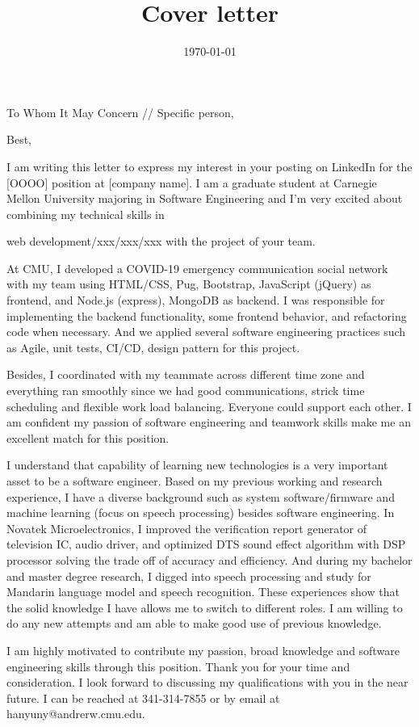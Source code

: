 \documentclass[11pt,a4paper,roman]{moderncv}        %
\title{Cover letter}                               %
\begin{document}
\recipient{\ }{}
\date{\today}
\opening{To Whom It May Concern // Specific person,}
\closing{Best,}
\makelettertitle

I am writing this letter to express my interest in your posting on LinkedIn for the [OOOO] position at [company name]. 
I am a graduate student at Carnegie Mellon University majoring in Software Engineering 
and I'm very excited about combining my technical skills in

web development/xxx/xxx/xxx with the project of your team.

At CMU, I developed a COVID-19 emergency communication social network with my team using HTML/CSS, Pug, Bootstrap, JavaScript
(jQuery) as frontend, and Node.js (express), MongoDB as backend. 
I was responsible for implementing the backend functionality, some frontend behavior, 
and refactoring code when necessary. 
And we applied several software engineering practices such as Agile, unit tests,
CI/CD, design pattern for this project. 

Besides, I coordinated with my teammate across different time zone and everything ran smoothly since we had good communications, 
strick time scheduling and flexible work load balancing. 
Everyone could support each other. 
I am confident my passion of software engineering and teamwork skills make me an excellent match for this position.


I understand that capability of learning new technologies is a very important asset to be a software engineer.
Based on my previous working and research experience, I have a diverse background such as system software/firmware and machine learning (focus on speech processing) besides software engineering.
In Novatek Microelectronics, I improved the verification report generator of television IC, audio driver, and optimized DTS sound effect algorithm with DSP processor solving the trade off of accuracy and efficiency.
And during my bachelor and master degree research, I digged into speech processing and study for Mandarin language model and speech recognition.
These experiences show that the solid knowledge I have allows me to switch to different roles. 
I am willing to do any new attempts and am able to make good use of previous knowledge.

I am highly motivated to contribute my passion, broad knowledge and software engineering skills through this position.
Thank you for your time and consideration. 
I look forward to discussing my qualifications with you in the near future. 
I can be reached at 341-314-7855 or by email at hanyuny@andrerw.cmu.edu.











\vspace{0.5cm}


\makeletterclosing
\end{document}
